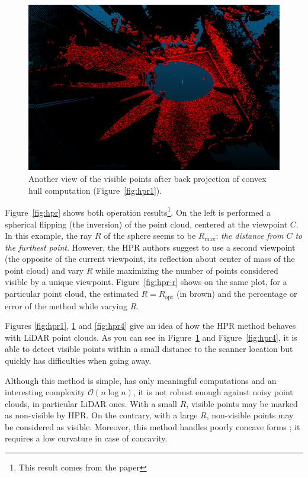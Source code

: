 \begin{figure}
  \centering
  \includegraphics[scale=0.45]{img/hpr3.png}
  \caption{Another view of the visible points after back projection of convex hull computation (Figure~\ref{fig:hpr1}).}
  \label{fig:hpr3}
\end{figure}


Figure~\ref{fig:hpr} shows both operation results\footnote{This result comes from the paper}. On the left is performed a spherical flipping (the inversion) of the point cloud, centered at the viewpoint $C$. In this example, the ray $R$ of the sphere seems to be $R_\text{max}$: \emph{the distance from $C$ to the furthest point}. However, the HPR authors suggest to use a second viewpoint (the opposite of the current viewpoint, its reflection about center of mass of the point cloud) and vary $R$ while maximizing the number of points considered visible by a unique viewpoint. Figure~\ref{fig:hpr-r} shows on the same plot, for a particular point cloud, the estimated $R=R_\text{opt}$ (in brown) and the percentage or error of the method while varying $R$.

Figures \ref{fig:hpr1}, \ref{fig:hpr3} and \ref{fig:hpr4} give an idea of how the HPR method behaves with LiDAR point clouds. As you can see in Figure~\ref{fig:hpr3} and Figure~\ref{fig:hpr4}, it is able to detect visible points within a small distance to the scanner location but quickly has difficulties when going away.

Although this method is simple, has only meaningful computations and an interesting complexity $\mathcal{O}(n\log{}n)$, it is not robust enough against noisy point clouds, in particular LiDAR ones. With a small $R$, visible points may be marked as non-visible by HPR. On the contrary, with a large $R$, non-visible points may be considered as visible. Moreover, this method handles poorly concave forms ; it requires a low curvature in case of concavity.


